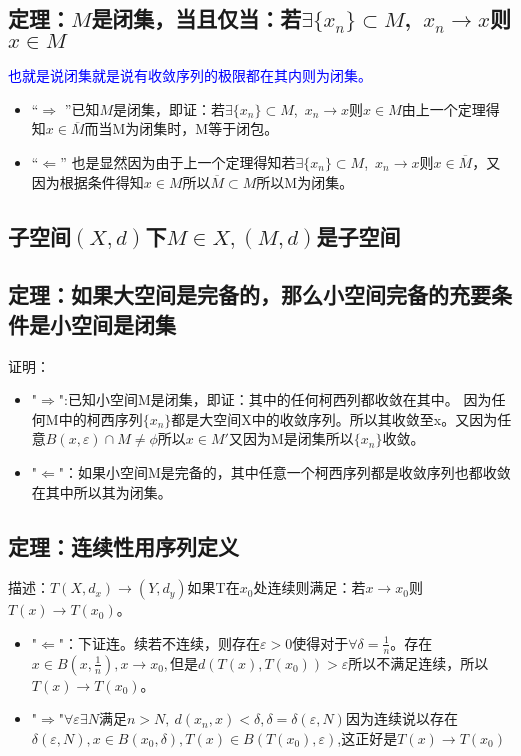 \documentclass[11pt]{article}
\begin{document}
\begin{CJK*}{UTF8}{gbsn}
\subsection{定理：$M$是闭集，当且仅当：若$\exists \{x_n\}\subset M$,~$x_n\rightarrow x$则$x\in M$}\textcolor{blue}{也就是说闭集就是说有收敛序列的极限都在其内则为闭集。}
\begin{itemize}
	\item “$\Rightarrow$ ”已知$M$是闭集，即证：若$\exists \{x_n\}\subset M$,~$x_n\rightarrow x$则$x\in M$由上一个定理得知$x\in \overline M$而当M为闭集时，M等于闭包。
	\item “$\Leftarrow$” 也是显然因为由于上一个定理得知若$\exists \{x_n\}\subset M$,~$x_n\rightarrow x$则$x\in \overline M$，又因为根据条件得知$x\in M$所以$\overline M\subset M$所以M为闭集。
\end{itemize}
\subsection{子空间$(X,d)$下$M\in X,(M,d)$是子空间}
\subsection{定理：如果大空间是完备的，那么小空间完备的充要条件是小空间是闭集}	证明：\begin{itemize}
	\item "$\Rightarrow$":已知小空间M是闭集，即证：其中的任何柯西列都收敛在其中。
	因为任何M中的柯西序列$\{x_n\} $都是大空间X中的收敛序列。所以其收敛至x。又因为任意$B(x,\varepsilon )\cap M\neq \phi$所以$x\in M'$又因为M是闭集所以$\{x_n\} $收敛。
	\item "$\Leftarrow$"：如果小空间M是完备的，其中任意一个柯西序列都是收敛序列也都收敛在其中所以其为闭集。
\end{itemize}
\subsection{定理：连续性用序列定义}
描述：$T(X,d_x)\rightarrow(Y,d_y)$如果T在$x_0$处连续则满足：若$x\rightarrow x_0$则$T(x)\rightarrow T(x_0)$。
\begin{itemize}
	\item "$\Leftarrow$"：下证连。续若不连续，则存在$\varepsilon>0$使得对于$\forall \delta=\frac{1}{n}$。存在$x\in B(x,\frac{1}{n}),x\rightarrow x_0 ,$但是$d(T(x),T(x_0))>\varepsilon$所以不满足连续，所以$T(x)\rightarrow T(x_0)$。
	\item "$\Rightarrow$"$\forall \varepsilon  \exists N$满足$n>N,~d(x_n,x)<\delta,\delta=\delta(\varepsilon,N )$因为连续说以存在$\delta(\varepsilon,N ),x\in B(x_0,\delta ),T(x)\in B(T(x_0),\varepsilon )$,这正好是$T(x)\rightarrow T(x_0)$
\end{itemize}


\end{CJK*}
\end{document}
